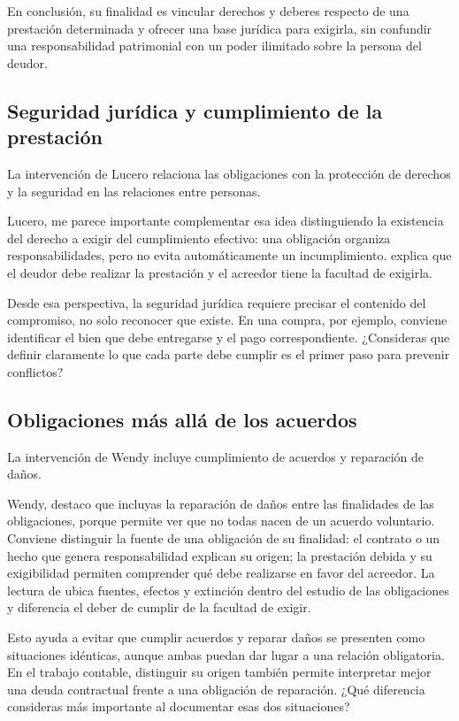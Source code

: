 {En conclusión, su finalidad es vincular derechos y deberes respecto de una prestación determinada y ofrecer una base jurídica para exigirla, sin confundir una responsabilidad patrimonial con un poder ilimitado sobre la persona del deudor.

\subsection{Seguridad jurídica y cumplimiento de la prestación}
La intervención de Lucero relaciona las obligaciones con la protección de derechos y la seguridad en las relaciones entre personas.

Lucero, me parece importante complementar esa idea distinguiendo la existencia del derecho a exigir del cumplimiento efectivo: una obligación organiza responsabilidades, pero no evita automáticamente un incumplimiento. \textcite[p.~24]{ramirezObligacionesS3} explica que el deudor debe realizar la prestación y el acreedor tiene la facultad de exigirla.

Desde esa perspectiva, la seguridad jurídica requiere precisar el contenido del compromiso, no solo reconocer que existe. En una compra, por ejemplo, conviene identificar el bien que debe entregarse y el pago correspondiente. ¿Consideras que definir claramente lo que cada parte debe cumplir es el primer paso para prevenir conflictos?

\subsection{Obligaciones más allá de los acuerdos}
La intervención de Wendy incluye cumplimiento de acuerdos y reparación de daños.

Wendy, destaco que incluyas la reparación de daños entre las finalidades de las obligaciones, porque permite ver que no todas nacen de un acuerdo voluntario. Conviene distinguir la fuente de una obligación de su finalidad: el contrato o un hecho que genera responsabilidad explican su origen; la prestación debida y su exigibilidad permiten comprender qué debe realizarse en favor del acreedor. La lectura de \textcite[pp.~20, 24]{ramirezObligacionesS3} ubica fuentes, efectos y extinción dentro del estudio de las obligaciones y diferencia el deber de cumplir de la facultad de exigir.

Esto ayuda a evitar que cumplir acuerdos y reparar daños se presenten como situaciones idénticas, aunque ambas puedan dar lugar a una relación obligatoria. En el trabajo contable, distinguir su origen también permite interpretar mejor una deuda contractual frente a una obligación de reparación. ¿Qué diferencia consideras más importante al documentar esas dos situaciones?

}
